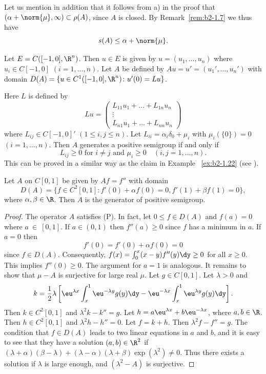 Let us mention in addition that it follows from a) in the proof that $(\alpha + \norm{\mu}, \infty) \subset \rho(A)$, since $A$ is closed.
By Remark~\ref{rem:b2-1.7} we thus have
\begin{equation}\label{eq:b2-1.14}
s(A) \leq \alpha + \norm{\mu}.
\end{equation}
\begin{example}\label{ex:b2-1.23}
Let $E = C([-1,0],\R^{n})$.
Then $u \in E$ is given by $u = (u_{1},\ldots,u_{n})$ where $u_{i} \in C[-1,0]$ $(i=1,\ldots,n)$.
Let $A$ be defined by $Au = u' = (u_{1}',\ldots,u_{n}')$ with domain $D(A) = \{u \in C^{1}([-1,0],\R^{n}) \colon u'(0) = Lu\}$.

Here $L$ is defined by
\[
    Lu = \begin{pmatrix}
        L_{11}u_{1} + \ldots + L_{1n}u_{n} \\
        \vdots \\
        L_{n1}u_{1} + \ldots + L_{nn}u_{n}
    \end{pmatrix}
\]
where $L_{ij} \in C[-1,0]'$ $(1 \leq i,j \leq n)$.
Let $L_{ii} = \alpha_{i}\delta_{0} + \mu_{i}$ with $\mu_{i}(\{0\}) = 0$ $(i = 1,\ldots,n)$.
Then $A$ generates a positive semigroup if and only if 
\[
L_{ij} \geq 0 \text{ for } i \neq j \text{ and } \mu_{i} \geq 0 \quad (i,j = 1,\ldots,n) .
\]
This can be proved in a similar way as the claim in Example ~\ref{ex:b2-1.22} 
(see \textcite{arendt:1984a}).
\end{example}

\begin{example}\label{ex:b2-1.24}
Let $A$ on $C[0,1]$ be given by $Af = f''$ with domain 
\[
D(A) = \{f \in C^{2}[0,1] \colon f'(0) + \alpha f(0) = 0, f'(1) + \beta f(1) = 0\},
\]
where $\alpha,\beta \in \R$.
Then $A$ is the generator of positive semigroup.
\end{example}

\begin{proof}
The operator $A$ satisfies (P).
In fact, let $0 \leq f \in D(A)$ and $f(a) = 0$ where $a~\in~[0,1]$.
If\/ $a \in (0,1)$ then $f''(a) \geq 0$ since $f$ has a minimum in $a$.
If\/ $a = 0$ then 
\[
f'(0) = f'(0) + \alpha f(0) = 0
\]
since $f \in D(A)$.
Consequently, $f(x) = \int_{0}^{x} (x-y)f''(y) \dy \geq 0$ for all $x \geq 0$.
This implies $f''(0) \geq 0$.
The argument for $a = 1$ is analogous.
It remains to show that $\mu - A$ is surjective for large real $\mu$.
Let $g \in C[0,1]$.
Let $\lambda > 0$ and 
\[k = \frac{1}{2}\lambda\left[\eu^{\lambda x}\int_{x}^{1} \eu^{-\lambda y}g(y)\dy - \eu^{-\lambda x}\int_{x}^{1} \eu^{\lambda y}g(y)\dy\right].
\]
Then $k \in C^{2}[0,1]$ and $\lambda^{2}k - k'' = g$.
Let $h = a\eu^{\lambda x} + b\eu^{-\lambda x}$, where $a,b \in \R$.
Then $h \in C^{2}[0,1]$ and $\lambda^{2}h - h'' = 0$.
Let $f = k + h$.
Then $\lambda^{2}f - f'' = g$.
The condition that $f \in D(A)$ leads to two linear equations in $a$ and $b$, and it is easy to see that they have a solution $(a,b) \in \R^{2}$ if\/ $(\lambda+\alpha)(\beta-\lambda) + (\lambda-\alpha)(\lambda+\beta)\exp(\lambda^{2}) \neq 0$.
Thus there exists a solution if\/ $\lambda$ is large enough, and $(\lambda^{2} - A)$ is surjective.
\end{proof}

